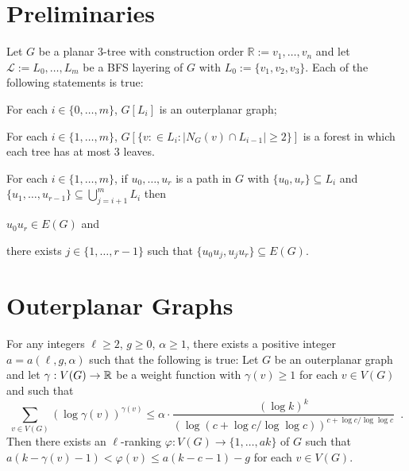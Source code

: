 \documentclass[kpfonts]{patmorin}
\theoremstyle{named}
\begin{document}


\section{Preliminaries}

\begin{lem}\label{three-tree-layers}
    Let $G$ be a planar 3-tree with construction order $\mathbb{R}:=v_1,\ldots,v_n$ and let $\mathcal{L}:=L_0,\ldots,L_m$ be a BFS layering of $G$ with $L_0:=\{v_1,v_2,v_3\}$.  Each of the following statements is true:
    \begin{compactenum}[(i)]
        \item For each $i\in\{0,\ldots,m\}$, $G[L_i]$ is an outerplanar graph;
        \item For each $i\in\{1,\ldots,m\}$, $G[\{v:\in L_i:|N_G(v)\cap L_{i-1}|\ge 2\}]$ is a forest in which each tree has at most 3 leaves.
        \item For each $i\in\{1,\ldots,m\}$, if $u_0,\ldots,u_r$ is a path in $G$ with $\{u_0,u_r\}\subseteq L_i$ and $\{u_1,\ldots,u_{r-1}\}\subseteq \bigcup_{j=i+1}^m L_i$ then
        \begin{compactenum}
            \item $u_0u_r\in E(G)$ and
            \item there exists $j\in\{1,\ldots,r-1\}$ such that $\{u_0u_j,u_ju_r\}\subseteq E(G)$.
        \end{compactenum}
    \end{compactenum}
\end{lem}


\section{Outerplanar Graphs}

\begin{lem}\label{outerplanar-lemma}
    For any integers $\ell\ge 2$, $g\ge 0$, $\alpha\ge 1$, there exists a positive integer $a=a(\ell,g,\alpha)$ such that the following is true:
    Let $G$ be an outerplanar graph and let $\gamma:V(G)\to\mathbb{R}$ be a weight function with $\gamma(v)\ge 1$ for each $v\in V(G)$ and such that
    \[  \sum_{v\in V(G)} (\log \gamma(v))^{\gamma(v)} \le \alpha\cdot\frac{(\log k)^k}{(\log    (c+\log c/\log\log c))^{c+\log c/\log\log c}} \enspace .
    \]
    Then there exists an $\ell$-ranking $\varphi:V(G)\to\{1,\ldots,ak\}$ of $G$ such that $a(k-\gamma(v)-1) < \varphi(v) \le a(k-c-1)-g$ for each $v\in V(G)$.
\end{lem}
\end{document}
